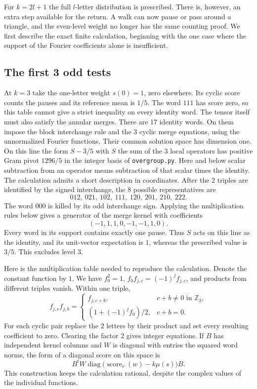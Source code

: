 \documentclass[11pt,a4paper]{amsart}
\newcommand{\score}{\operatorname{score}}
\begin{document}
For $k=2l+1$ the full $l$-letter distribution is prescribed. There is, however, an extra step available for the return. A walk can now pause or pass around a triangle, and the even-level weight no longer has the same counting proof. We first describe the exact finite calculation, beginning with the one case where the support of the Fourier coefficients alone is insufficient.

\subsection{The first 3 odd tests}
At $k=3$ take the one-letter weight $s(0)=1$, zero elsewhere. Its cyclic score counts the pauses and its reference mean is $1/5$. The word $111$ has score zero, so this table cannot give a strict inequality on every identity word. The tensor itself must also satisfy the annular merges. There are 17 identity words. On them impose the block interchange rule and the 3 cyclic merge equations, using the unnormalized Fourier functions. Their common solution space has dimension one. On this line the form $S-3/5$ with $S$ the sum of the 3 local operators has positive Gram pivot $1296/5$ in the integer basis of \texttt{overgroup.py}. Here and below scalar subtraction from an operator means subtraction of that scalar times the identity. The calculation admits a short description in coordinates. After the 2 triples are identified by the signed interchange, the 8 possible representatives are
\[
 012,\ 021,\ 102,\ 111,\ 120,\ 201,\ 210,\ 222 .
\]
The word $000$ is killed by its odd interchange sign. Applying the multiplication rules below gives a generator of the merge kernel with coefficients
\[
 (-1,1,1,0,-1,-1,1,0).
\]
Every word in its support contains exactly one pause. Thus $S$ acts on this line as the identity, and its unit-vector expectation is $1$, whereas the prescribed value is $3/5$. This excludes level 3.

Here is the multiplication table needed to reproduce the calculation. Denote the constant function by $1$. We have $f_0^2=1$, $f_0 f_{j,c}=(-1)^j f_{j,c}$, and products from different triples vanish. Within one triple,
\[
 f_{j,c} f_{j,b}=
 \begin{cases}
 f_{j,c+b},&c+b\ne0\text{ in }\mathbb Z_3,\\
 (1+(-1)^j f_0)/2,&c+b=0.
 \end{cases}
\]
For each cyclic pair replace the 2 letters by their product and set every resulting coefficient to zero. Clearing the factor 2 gives integer equations. If $B$ has independent kernel columns and $W$ is diagonal with entries the squared word norms, the form of a diagonal score on this space is
\[
 B^t W\operatorname{diag}\big(\score_s(w)-k\mu(s)\big)B.
\]
This construction keeps the calculation rational, despite the complex values of the individual functions.
\end{document}
